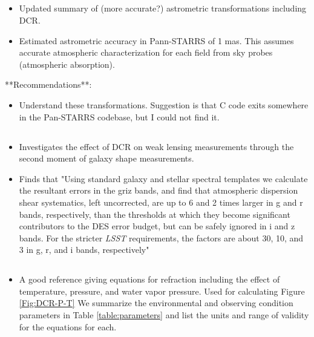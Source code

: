 \documentclass[]{article}
\begin{document}

\subsection{\cite{Chambers2005}}

\begin{itemize}
	\item Updated summary of (more accurate?) astrometric transformations including DCR.
	\item Estimated astrometric accuracy in Pann-STARRS of 1
          mas. This assumes accurate atmospheric characterization for
          each field from sky probes (atmospheric absorption).
\end{itemize}

**Recommendations**:
\begin{itemize}
	\item Understand these transformations. Suggestion is that C
          code exits somewhere in the Pan-STARRS codebase, but I could
          not find it.
\end{itemize}

\subsection{\cite{AlejandroPlazas2012}}
\begin{itemize}
	\item Investigates the effect of DCR on weak lensing measurements through the second moment of galaxy shape measurements.
	\item Finds that "Using standard galaxy and stellar spectral templates we calculate the resultant errors in the griz bands, and find that atmospheric dispersion shear systematics, left uncorrected, are up to 6 and 2 times larger in g and r bands, respectively, than the thresholds at which they become significant contributors to the DES error budget, but can be safely ignored in i and z bands. For the stricter \textit{LSST} requirements, the factors are about 30, 10, and 3 in g, r, and i bands, respectively"
\end{itemize}

\subsection{\cite{Stone1996}}
\begin{itemize}
	\item A good reference giving equations for refraction
          including the effect of temperature, pressure, and water
          vapor pressure. Used for calculating Figure
          \ref{Fig:DCR-P-T}
          We summarize the environmental and observing condition parameters in Table \ref{table:parameters} and list the units and range of validity for the equations for each.

\end{itemize}
\end{document}
